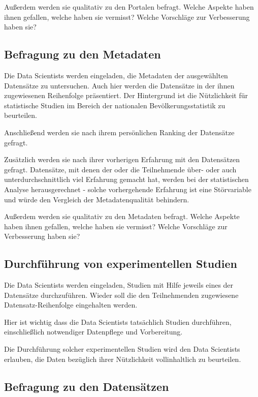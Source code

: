 \documentclass[a4paper,10pt,german,public]{INSOexpose}
\begin{document}
Außerdem werden sie qualitativ zu den Portalen
befragt. Welche Aspekte haben ihnen gefallen, welche haben sie vermisst?
Welche Vorschläge zur Verbesserung haben sie?

\subsection{Befragung zu den Metadaten}

Die Data Scientists werden eingeladen, die Metadaten der ausgewählten
Datensätze zu untersuchen. Auch hier werden die Datensätze in der
ihnen zugewiesenen Reihenfolge präsentiert.
Der Hintergrund ist die Nützlichkeit für statistische Studien im
Bereich der nationalen Bevölkerungsstatistik zu beurteilen.

Anschließend werden sie nach ihrem persönlichen Ranking der Datensätze
gefragt.

Zusätzlich werden sie nach ihrer vorherigen Erfahrung mit den Datensätzen
gefragt. Datensätze, mit denen der oder die Teilnehmende über- oder
auch unterdurchschnittlich viel Erfahrung gemacht hat, werden bei der
statistischen Analyse herausgerechnet - solche vorhergehende
Erfahrung ist eine Störvariable und würde den Vergleich der
Metadatenqualität behindern.

Außerdem werden sie qualitativ zu den Metadaten
befragt. Welche Aspekte haben ihnen gefallen, welche haben sie vermisst?
Welche Vorschläge zur Verbesserung haben sie?

\subsection{Durchführung von experimentellen Studien}

Die Data Scientists werden eingeladen, Studien mit Hilfe
jeweils eines der Datensätze durchzuführen.
Wieder soll die den Teilnehmenden zugewiesene Datensatz-Reihenfolge
eingehalten werden.

Hier ist wichtig dass die Data Scientists tatsächlich Studien durchführen,
einschließlich notwendiger Datenpflege und Vorbereitung.

Die Durchführung solcher experimentellen Studien wird den
Data Scientists erlauben, die Daten bezüglich ihrer Nützlichkeit
vollinhaltlich zu beurteilen.

\subsection{Befragung zu den Datensätzen}
\end{document}
